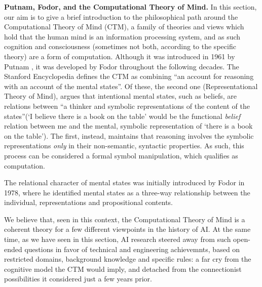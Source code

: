 \documentclass[../main.tex]{subfiles}
\begin{document}
\vspace{4pt}
\textbf{Putnam, Fodor, and the Computational Theory of Mind.}
In this section, our aim is to give a brief introduction to the philosophical path around the Computational Theory of Mind (CTM), a family of theories and views which hold that the human mind is an information processing system, and as such cognition and consciousness (sometimes not both, according to the specific theory) are a form of computation. Although it was introduced in 1961 by Putnam \cite{horstComputationalTheoryMind2003}, it was developed by Fodor throughout the following decades. The Stanford Encyclopedia defines the CTM as combining ``an account for reasoning with an account of the mental states''. Of these, the second one (Representational Theory of Mind), argues that intentional mental states, such as beliefs, are relations between ``a thinker and symbolic representations of the content of the states''(`I believe there is a book on the table' would be the functional \textit{belief} relation between me and the mental, symbolic representation of `there is a book on the table'). The first, instead, maintains that reasoning involves the symbolic representations \textit{only} in their non-semantic, syntactic properties. As such, this process can be considered a formal symbol manipulation, which qualifies as computation.

The relational character of mental states was initially introduced by Fodor in 1978\cite{fodorPropositionalAttitudes1978}, where he identified mental states as a three-way relationship between the individual, representations and propositional contents.

\vspace{5pt}
We believe that, seen in this context, the Computational Theory of Mind is a coherent theory for a few different viewpoints in the history of AI. At the same time, as we have seen in this section, AI research steered away from such open-ended questions in favor of technical and engineering achievemnts, based on restricted domains, background knowledge and specific rules: a far cry from the cognitive model the CTM would imply, and detached from the connectionist possibilities it considered just a few years prior.
\end{document}
